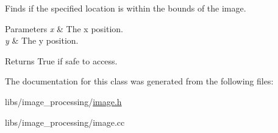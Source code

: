 Finds if the specified location is within the bounds of the image. 


\begin{DoxyParams}{Parameters}
{\em x} & The x position. \\
\hline
{\em y} & The y position. \\
\hline
\end{DoxyParams}
\begin{DoxyReturn}{Returns}
True if safe to access. 
\end{DoxyReturn}


The documentation for this class was generated from the following files\+:\begin{DoxyCompactItemize}
\item 
libs/image\+\_\+processing/\hyperlink{image_8h}{image.\+h}\item 
libs/image\+\_\+processing/image.\+cc\end{DoxyCompactItemize}
